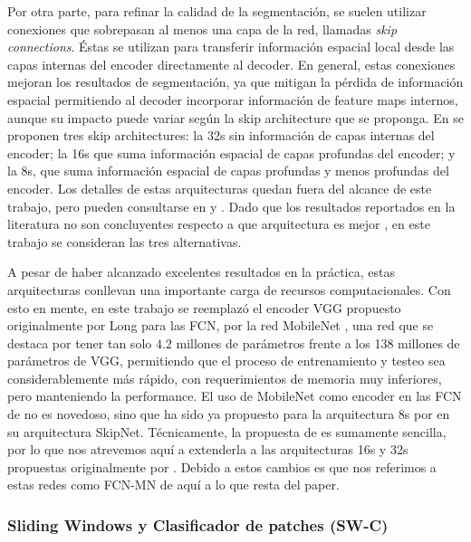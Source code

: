 \documentclass[a4paper,authoryear,review]{elsarticle}
\begin{document}
Por otra parte, para refinar la calidad de la segmentación, se suelen utilizar conexiones que sobrepasan al menos una capa de la red, llamadas \emph{skip connections}. Éstas se utilizan para transferir información espacial local desde las capas internas del encoder directamente al decoder. En general, estas conexiones mejoran los resultados de segmentación, ya que mitigan la pérdida de información espacial permitiendo al decoder incorporar información de feature maps internos, aunque su impacto puede variar según la skip architecture que se proponga. En \citet{long2015fully} se proponen tres skip architectures: la 32s sin información de capas internas del encoder; la 16s que suma información espacial de capas profundas del encoder; y la 8s, que suma información espacial de capas profundas y menos profundas del encoder. Los detalles de estas arquitecturas quedan fuera del alcance de este trabajo, pero pueden consultarse en \citet{long2015fully} y \cite{shelhamer2017fully}. Dado que los resultados reportados en la literatura no son concluyentes respecto a que arquitectura es mejor \cite{long2015fully, shelhamer2017fully}, en este trabajo se consideran las tres alternativas.

A pesar de haber alcanzado excelentes resultados en la práctica,  estas arquitecturas conllevan una importante carga de recursos computacionales. Con esto en mente, en este trabajo se reemplazó el encoder VGG \cite{Simonyan2015VeryDC} propuesto originalmente por Long para las FCN, por la red MobileNet \cite{howard2017mobilenets}, una red que se destaca por tener tan solo $4.2$ millones de parámetros frente a los 138 millones de parámetros de VGG, permitiendo que el proceso de entrenamiento y testeo sea considerablemente más rápido, con requerimientos de memoria muy inferiores, pero manteniendo la performance. El uso de MobileNet como encoder en las FCN de \citet{long2015fully} no es novedoso, sino que ha sido ya propuesto para la arquitectura 8s por \citet{siam2018rtseg} en su arquitectura SkipNet. Técnicamente, la propuesta de \citet{siam2018rtseg} es sumamente sencilla, por lo que nos atrevemos aquí a extenderla a las arquitecturas 16s y 32s propuestas originalmente por \citep{long2015fully}. Debido a estos cambios es que nos referimos a estas redes como FCN-MN de aquí a lo que resta del paper.


\subsubsection{Sliding Windows y Clasificador de patches (SW-C)}
\label{sec:sw}
\end{document}
